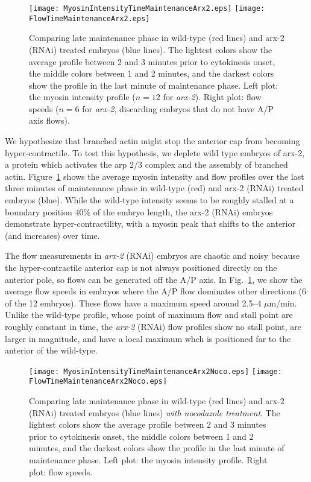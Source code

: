 \documentclass[11pt]{article}
\newcommand{\6}[1]{#1_{\text{6}}}
\newcommand{\3}[1]{#1_{\text{3}}}
\begin{document}
\begin{figure}
\centering
\texttt{[image: MyosinIntensityTimeMaintenanceArx2.eps]}
\texttt{[image: FlowTimeMaintenanceArx2.eps]}
\caption{\label{fig:Arp23Myosin} Comparing late maintenance phase in wild-type (red lines) and arx-2 (RNAi) treated embryos (blue lines). The lightest colors show the average profile between 2 and 3 minutes prior to cytokinesis onset, the middle colors between 1 and 2 minutes, and the darkest colors show the profile in the last minute of maintenance phase. Left plot: the myosin intensity profile ($n=12$ for \emph{arx-2}). Right plot: flow speeds ($n=6$ for \emph{arx-2}, discarding embryos that do not have A/P axis flows).}
\end{figure}

We hypothesize that branched actin might stop the anterior cap from becoming hyper-contractile. To test this hypothesis, we deplete wild type embryos of arx-2, a protein which activates the arp 2/3 complex and the assembly of branched actin. Figure\ \ref{fig:Arp23Myosin} shows the average myosin intensity and flow profiles over the last three minutes of maintenance phase in wild-type (red) and arx-2 (RNAi) treated embryos (blue). While the wild-type intensity seems to be roughly stalled at a boundary position 40\% of the embryo length, the arx-2 (RNAi) embryos demonstrate hyper-contractility, with a myosin peak that shifts to the anterior (and increases) over time.

The flow measurements in \emph{arx-2} (RNAi) embryos are chaotic and noisy because the hyper-contractile anterior cap is not always positioned directly on the anterior pole, so flows can be generated off the A/P axis. In Fig.\ \ref{fig:Arp23Myosin}, we show the average flow speeds in embryos where the A/P flow dominates other directions (6 of the 12 embryos). These flows have a maximum speed around 2.5--4 $\mu$m/min. Unlike the wild-type profile, whose point of maximum flow and stall point are roughly constant in time, the \emph{arx-2} (RNAi) flow profiles show no stall point, are larger in magnitude, and have a local maximum whch is positioned far to the anterior of the wild-type. 


\begin{figure}
\centering
\texttt{[image: MyosinIntensityTimeMaintenanceArx2Noco.eps]}
\texttt{[image: FlowTimeMaintenanceArx2Noco.eps]}
\caption{\label{fig:Arp23Noc} Comparing late maintenance phase in wild-type (red lines) and arx-2 (RNAi) treated embryos (blue lines) \emph{with nocodazole treatment}. The lightest colors show the average profile between 2 and 3 minutes prior to cytokinesis onset, the middle colors between 1 and 2 minutes, and the darkest colors show the profile in the last minute of maintenance phase. Left plot: the myosin intensity profile. Right plot: flow speeds.}
\end{figure}
\end{document}
